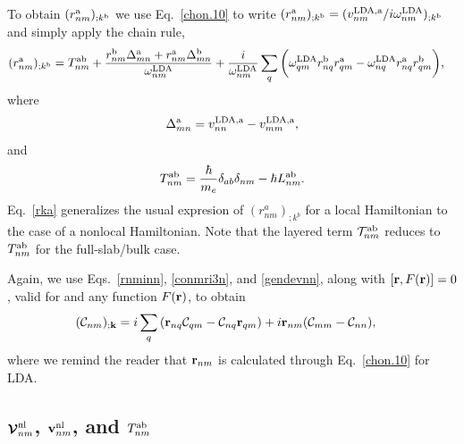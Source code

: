 \documentclass[floatfix,prb,aps,superscriptaddress,showpacs,11pt,preprint,letterpaper]{revtex4}
\begin{document}
To obtain $(r^{\mathrm{a}}_{nm})_{;k^{\mathrm{b}}}$ we use Eq.~\eqref{chon.10} to
write
$(r^{\mathrm{a}}_{nm})_{;k^{\mathrm{b}}}
=(v^{\mathrm{LDA},\mathrm{a}}_{nm}/i\omega^{\mathrm{LDA}}_{nm})_{;k^{\mathrm{b}}}
$ and simply apply the chain rule,
\begin{align}\label{rka}
(r^{\mathrm{a}}_{nm})_{;k^{\mathrm{b}}}
&=
T^{\mathrm{a}\mathrm{b}}_{nm}
+
\frac{ 
r^{\mathrm{b}}_{nm}
\Delta^{\mathrm{a}}_{mn}
+r^{\mathrm{a}}_{nm}
\Delta^{\mathrm{b}}_{mn}
}
{\omega^{\mathrm{LDA}}_{nm}}
+
\frac{i}{\omega^{\mathrm{LDA}}_{nm}}
\sum_{q}
\bigg(
\omega^{\mathrm{LDA}}_{q m} 
r^{\mathrm{b}}_{nq} 
r^{\mathrm{a}}_{q m}
-
\omega^{\mathrm{LDA}}_{nq} 
r^{\mathrm{a}}_{nq} 
r^{\mathrm{b}}_{q m}
\bigg)
,
\end{align} 
where 
\begin{eqnarray}\label{del}
\Delta^{\mathrm{a}}_{mn}
=
v^{\mathrm{LDA},\mathrm{a}}_{nn}  
-
v^{\mathrm{LDA},\mathrm{a}}_{mm}  
,
\end{eqnarray}
and
\begin{align}\label{tau.1n} 
T_{nm}^{\mathrm{a}\mathrm{b}}
=\frac{\hbar}{m_e}\delta_{ab}\delta_{nm} 
-\hbar L^{\mathrm{a}\mathrm{b}}_{nm} 
.
\end{align}
Eq.~\eqref{rka} generalizes the usual expresion of
$(r^a_{nm})_{;k^b}$ for a local 
Hamiltonian
\cite{aversaPRB95,nastosPRB05,cabellosPRB09,rashkeevPRB98}
to
the case of a
nonlocal Hamiltonian.
Note that the layered term
${\cal T}^{\mathrm{a}\mathrm{b}}_{nm}$ reduces to $T^{\mathrm{a}\mathrm{b}}_{nm}$
for the full-slab/bulk case.

Again, we use Eqs.~\eqref{rnminn}, \eqref{conmri3n}, and \eqref{gendevnn},
along with $[\mathbf{r},F(\mathbf{r})]=0$, valid for 
and any function $F(\mathbf{r})$, 
to obtain 
\begin{align} 
({\mathbf{\cal C}}_{nm})_{;\mathbf{k}}
&=
i 
\sum_{q} 
 \left(\mathbf{r}_{nq}
{\mathbf{\cal C}}_{qm}
-
{\mathbf{\cal C}}_{nq}
\mathbf{r}_{qm}
\right) 
+i\mathbf{r}_{nm}({\mathbf{\cal C}}_{mm}-{\mathbf{\cal C}}_{nn}) 
,
\end{align} 
where we remind the reader that $\mathbf{r}_{nm}$ 
is calculated through 
Eq.~\eqref{chon.10} for LDA. 


\subsection{
\texorpdfstring{$\boldsymbol{\mathcal{\cal V}}^{\mathrm{nl}}_{nm}$}{Vnonlocal},
\texorpdfstring{$\mathbf{v}^{\mathrm{nl}}_{nm}$}{Vnonlocal}, and 
\texorpdfstring{$T^{\mathrm{a}\mathrm{b}}_{nm}$}{[r,vnl]}}
\label{vesnl}
\end{document}
